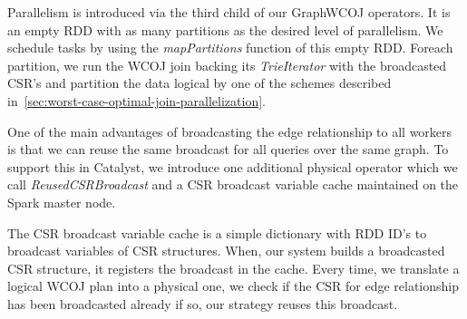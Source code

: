 Parallelism is introduced via the third child of our GraphWCOJ operators.
It is an empty RDD with as many partitions as the desired level of parallelism.
We schedule tasks by using the \textit{mapPartitions} function of this empty RDD.
Foreach partition, we run the \textsc{WCOJ} join backing its \textit{TrieIterator} with the broadcasted CSR's and partition the data
logical by one of the schemes described in~\cref{sec:worst-case-optimal-join-parallelization}.

One of the main advantages of broadcasting the edge relationship to all workers is that we can reuse the same broadcast for all queries
over the same graph.
To support this in Catalyst, we introduce one additional physical operator which we call \textit{ReusedCSRBroadcast} and a CSR broadcast
variable cache maintained on the Spark master node.

The CSR broadcast variable cache is a simple dictionary with RDD ID's to broadcast variables of CSR structures.
When, our system builds a broadcasted CSR structure, it registers the broadcast in the cache.
Every time, we translate a logical WCOJ plan into a physical one, we check if the CSR for edge relationship has been broadcasted already
if so, our strategy reuses this broadcast.



